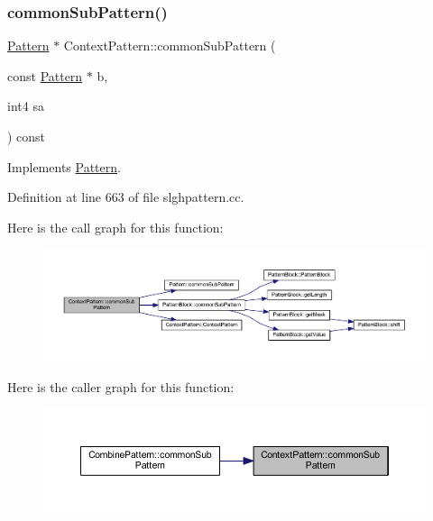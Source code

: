 \subsubsection{\texorpdfstring{commonSubPattern()}{commonSubPattern()}}
{\footnotesize\ttfamily \mbox{\hyperlink{class_pattern}{Pattern}} $\ast$ Context\+Pattern\+::common\+Sub\+Pattern (\begin{DoxyParamCaption}\item[{const \mbox{\hyperlink{class_pattern}{Pattern}} $\ast$}]{b,  }\item[{int4}]{sa }\end{DoxyParamCaption}) const\hspace{0.3cm}{\ttfamily [virtual]}}



Implements \mbox{\hyperlink{class_pattern_a54daed6fc84146ad309a25dfa8a68052}{Pattern}}.



Definition at line 663 of file slghpattern.\+cc.

Here is the call graph for this function\+:
\nopagebreak
\begin{figure}[H]
\begin{center}
\leavevmode
\includegraphics[width=350pt]{class_context_pattern_a6fb24df62ecafb88fb1a41e8b710ab62_cgraph}
\end{center}
\end{figure}
Here is the caller graph for this function\+:
\nopagebreak
\begin{figure}[H]
\begin{center}
\leavevmode
\includegraphics[width=350pt]{class_context_pattern_a6fb24df62ecafb88fb1a41e8b710ab62_icgraph}
\end{center}
\end{figure}
\mbox{\label{class_context_pattern_acffa2b64552acaf8824b2093119f9eca}} 
